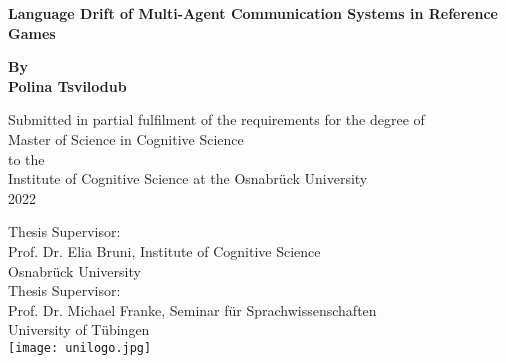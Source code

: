 \begin{titlepage}
	\begin{center}
		\vspace*{1cm}
		\Huge
		\textbf{Language Drift of Multi-Agent Communication Systems in Reference Games\\} 
		\vspace{0.5cm}
		\Large
	
		\textbf{By \\ Polina Tsvilodub}
		
		\vspace{1cm}
		\small
		Submitted in partial fulfilment of the requirements for the degree of \\
		Master of Science in Cognitive Science \\ to the \\
		Institute of Cognitive Science at the Osnabrück University\\
		2022
		
		\vspace{2cm}
		Thesis Supervisor:\\ Prof. Dr. Elia Bruni, Institute of Cognitive Science \\Osnabr\"uck University\\
		\vspace{0.5cm}
		Thesis Supervisor:\\ Prof. Dr. Michael Franke, Seminar f\"ur Sprachwissenschaften\\ University of T\"ubingen \\  
		\vfill 
		\texttt{[image: unilogo.jpg]}
		
	\end{center}
\end{titlepage}